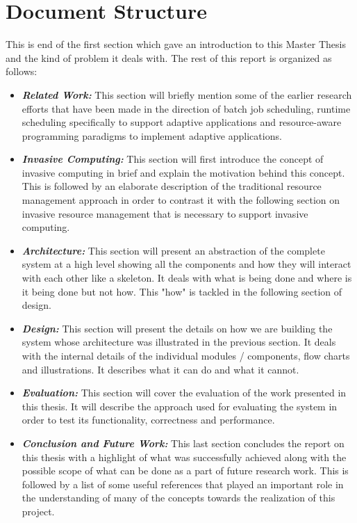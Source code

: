 \section{Document Structure}
This is end of the first section which gave an introduction to this Master Thesis and the kind of problem it deals with. The rest of this report is organized as follows:
\begin{itemize}
\item \textbf{\textit{Related Work:}} This section will briefly mention some of the earlier research efforts that have been made in the direction of batch job scheduling, runtime scheduling specifically to support adaptive applications and resource-aware programming paradigms to implement adaptive applications. 
\item \textbf{\textit{Invasive Computing:}} This section will first introduce the concept of invasive computing in brief and explain the motivation behind this concept. This is followed by an elaborate description of the traditional resource management approach in order to contrast it with the following section on invasive resource management that is necessary to support invasive computing. 
\item \textbf{\textit{Architecture:}} This section will present an abstraction of the complete system at a high level showing all the components and how they will interact with each other like a skeleton. It deals with what is being done and where is it being done but not how. This "how" is tackled in the following section of design.
\item \textbf{\textit{Design:}} This section will present the details on how we are building the system whose architecture was illustrated in the previous section. It deals with the internal details of the individual modules / components, flow charts and illustrations. It describes what it can do and what it cannot.
\item \textbf{\textit{Evaluation:}} This section will cover the evaluation of the work presented in this thesis. It will describe the approach used for evaluating the system in order to test its functionality, correctness and performance.
\item \textbf{\textit{Conclusion and Future Work:}} This last section concludes the report on this thesis with a highlight of what was successfully achieved along with the possible scope of what can be done as a part of future research work. This is followed by a list of some useful references that played an important role in the understanding of many of the concepts towards the realization of this project.
\end{itemize}
